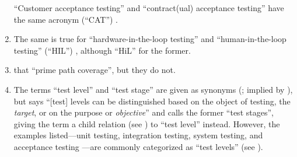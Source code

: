 \begin{enumerate}
          ``Customer acceptance testing'' and ``contract(ual) acceptance
          testing'' have the same acronym (``CAT'') \citep[p.~30]{Firesmith2015}.
    \item %
          The same is true for ``hardware-in-the-loop testing'' and
          ``human-in-the-loop testing'' (``HIL'') \citep[p.~23]{Firesmith2015},
          although \citet[p.~2] {PreußeEtAl2012}  ``HiL''
          for the former.
    \item %
          \citet[p.~184]{DoğanEtAl2014}  that
          \citet{SakamotoEtAl2013}  ``prime path
          coverage'', but they do not.
    \item %
          The terms ``test level'' and ``test stage'' are given as synonyms
          (\citealpISTQB{}; implied by \citealp[p.~9]{Gerrard2000a}), but
          \citet[p.~5\=/6]{SWEBOK2024} says ``[test] levels can be distinguished
          based on the object of testing, the \emph{target}, or on the purpose
          or \emph{objective}'' and calls the former ``test stages'', giving
          the term a child relation (see ) to ``test level''
          instead. However, the examples listed---unit testing, integration
          testing, system testing, and acceptance testing
          \citep[pp.~5\=/6 to 5\=/7]{SWEBOK2024}---are commonly categorized as
          ``test levels'' (see ).


\end{enumerate}
